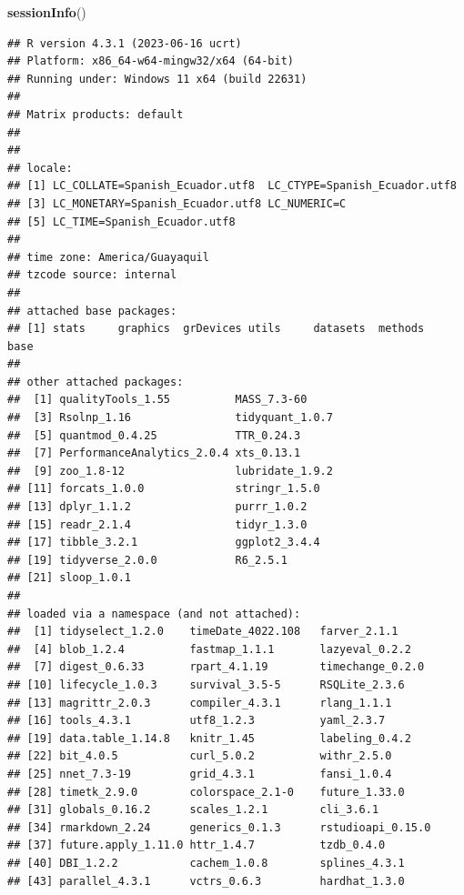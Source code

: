\documentclass[
]{book}
\newenvironment{Shaded}{\begin{snugshade}}{\end{snugshade}}
\newcommand{\FunctionTok}[1]{\textcolor[rgb]{0.13,0.29,0.53}{\textbf{#1}}}
\newcommand{\NormalTok}[1]{#1}
\begin{document}
\begin{Shaded}
\begin{Highlighting}[]
\FunctionTok{sessionInfo}\NormalTok{()}
\end{Highlighting}
\end{Shaded}

\begin{verbatim}
## R version 4.3.1 (2023-06-16 ucrt)
## Platform: x86_64-w64-mingw32/x64 (64-bit)
## Running under: Windows 11 x64 (build 22631)
## 
## Matrix products: default
## 
## 
## locale:
## [1] LC_COLLATE=Spanish_Ecuador.utf8  LC_CTYPE=Spanish_Ecuador.utf8   
## [3] LC_MONETARY=Spanish_Ecuador.utf8 LC_NUMERIC=C                    
## [5] LC_TIME=Spanish_Ecuador.utf8    
## 
## time zone: America/Guayaquil
## tzcode source: internal
## 
## attached base packages:
## [1] stats     graphics  grDevices utils     datasets  methods   base     
## 
## other attached packages:
##  [1] qualityTools_1.55          MASS_7.3-60               
##  [3] Rsolnp_1.16                tidyquant_1.0.7           
##  [5] quantmod_0.4.25            TTR_0.24.3                
##  [7] PerformanceAnalytics_2.0.4 xts_0.13.1                
##  [9] zoo_1.8-12                 lubridate_1.9.2           
## [11] forcats_1.0.0              stringr_1.5.0             
## [13] dplyr_1.1.2                purrr_1.0.2               
## [15] readr_2.1.4                tidyr_1.3.0               
## [17] tibble_3.2.1               ggplot2_3.4.4             
## [19] tidyverse_2.0.0            R6_2.5.1                  
## [21] sloop_1.0.1               
## 
## loaded via a namespace (and not attached):
##  [1] tidyselect_1.2.0    timeDate_4022.108   farver_2.1.1       
##  [4] blob_1.2.4          fastmap_1.1.1       lazyeval_0.2.2     
##  [7] digest_0.6.33       rpart_4.1.19        timechange_0.2.0   
## [10] lifecycle_1.0.3     survival_3.5-5      RSQLite_2.3.6      
## [13] magrittr_2.0.3      compiler_4.3.1      rlang_1.1.1        
## [16] tools_4.3.1         utf8_1.2.3          yaml_2.3.7         
## [19] data.table_1.14.8   knitr_1.45          labeling_0.4.2     
## [22] bit_4.0.5           curl_5.0.2          withr_2.5.0        
## [25] nnet_7.3-19         grid_4.3.1          fansi_1.0.4        
## [28] timetk_2.9.0        colorspace_2.1-0    future_1.33.0      
## [31] globals_0.16.2      scales_1.2.1        cli_3.6.1          
## [34] rmarkdown_2.24      generics_0.1.3      rstudioapi_0.15.0  
## [37] future.apply_1.11.0 httr_1.4.7          tzdb_0.4.0         
## [40] DBI_1.2.2           cachem_1.0.8        splines_4.3.1      
## [43] parallel_4.3.1      vctrs_0.6.3         hardhat_1.3.0      

\end{verbatim}
\end{document}
